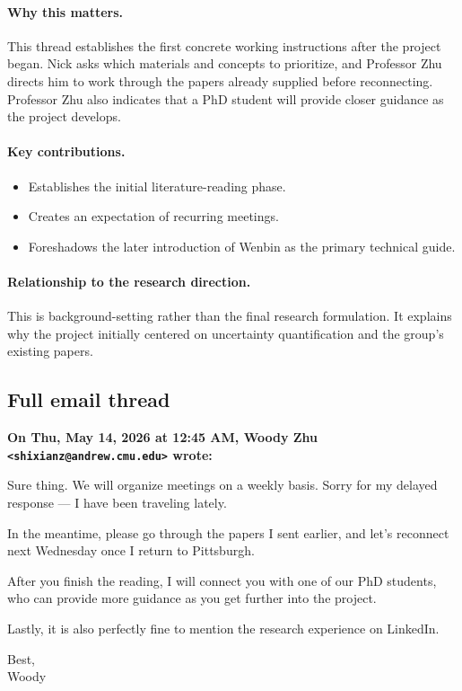 \documentclass[11pt]{article}
\newcommand{\Email}[3]{%
  \medskip\noindent\textbf{On #1, #2 wrote:}\par\nobreak
  \begingroup\RaggedRight #3\par\endgroup
}
\begin{document}
\paragraph{Why this matters.}
This thread establishes the first concrete working instructions after the
project began. Nick asks which materials and concepts to prioritize, and
Professor Zhu directs him to work through the papers already supplied before
reconnecting. Professor Zhu also indicates that a PhD student will provide
closer guidance as the project develops.

\paragraph{Key contributions.}
\begin{itemize}[leftmargin=*,itemsep=0.25em]
  \item Establishes the initial literature-reading phase.
  \item Creates an expectation of recurring meetings.
  \item Foreshadows the later introduction of Wenbin as the primary technical
        guide.
\end{itemize}

\paragraph{Relationship to the research direction.}
This is background-setting rather than the final research formulation. It
explains why the project initially centered on uncertainty quantification and
the group's existing papers.

\subsection*{Full email thread}
\Email{Thu, May 14, 2026 at 12:45 AM}{Woody Zhu
\texttt{<shixianz@andrew.cmu.edu>}}{%
Sure thing. We will organize meetings on a weekly basis. Sorry for my delayed
response --- I have been traveling lately.

In the meantime, please go through the papers I sent earlier, and let's
reconnect next Wednesday once I return to Pittsburgh.

After you finish the reading, I will connect you with one of our PhD students,
who can provide more guidance as you get further into the project.

Lastly, it is also perfectly fine to mention the research experience on
LinkedIn.

Best,\\
Woody}
\end{document}
